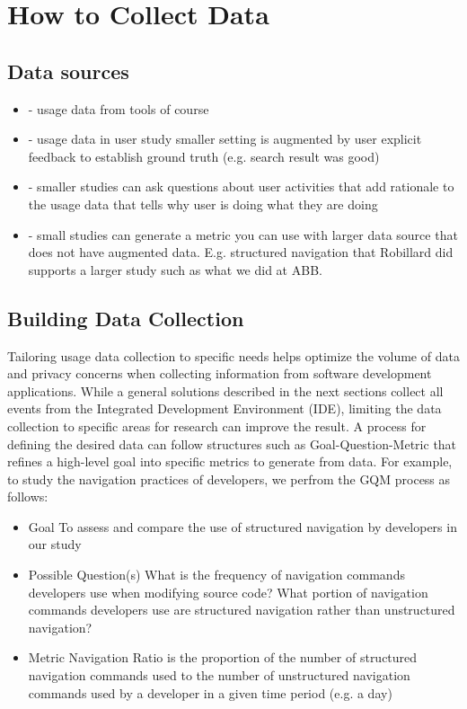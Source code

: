 \section{How to Collect Data}



\subsection{ Data sources}
    \begin{itemize}
    \item
	- usage data from tools of course
\item
	- usage data in user study smaller setting is augmented by user explicit feedback to establish ground truth (e.g. search result was good) 
\item
	- smaller studies can ask questions about user activities that add rationale to the usage data that tells why user is doing what they are doing
\item 
	- small studies can generate a metric you can use with larger data source that does not have augmented data.  E.g. structured navigation that Robillard did supports a larger study such as what we did at ABB.
    \end{itemize}

\subsection{ Building Data Collection} 
  \label{BuildingDataCollection}

	Tailoring usage data collection to specific needs helps optimize the volume of data and privacy concerns when collecting information from software development applications.  While a general solutions described in the next sections collect all events from the Integrated Development Environment (IDE), limiting the data collection to specific areas for research can improve the result.  A process for defining the desired data can follow structures such as Goal-Question-Metric \cite{basili-GQM}  that refines a high-level goal into specific metrics to generate from data.  For example, to study the navigation practices of developers, we perfrom the GQM process as follows:
    \begin{itemize}
\item 
	Goal
\subitem 
	To assess and compare the use of structured navigation by developers in our study
\item 
	Possible Question(s)
\subitem
	What is the frequency  of navigation commands developers use when modifying source code?
\subitem
	What portion of navigation commands developers use are structured navigation rather than unstructured navigation?
\item
	Metric
\subitem
	Navigation Ratio is the proportion of the number of structured navigation commands used to the number of unstructured navigation commands used by a developer in a given time period (e.g. a day)

	    \end{itemize}

